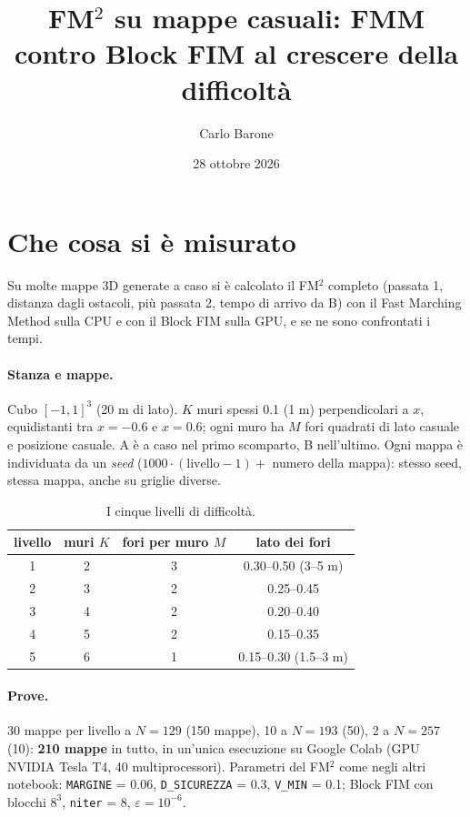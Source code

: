 \documentclass[11pt,a4paper]{article}
\title{FM$^2$ su mappe casuali: FMM contro Block FIM al crescere della difficoltà}
\author{Carlo Barone}
\date{28 ottobre 2026}
\begin{document}
\maketitle

\section{Che cosa si è misurato}
Su molte mappe 3D generate a caso si è calcolato il FM$^2$ completo (passata 1, distanza dagli ostacoli, più passata 2, tempo di arrivo da B) con il Fast Marching Method sulla CPU e con il Block FIM sulla GPU, e se ne sono confrontati i tempi.

\paragraph{Stanza e mappe.} Cubo $[-1,1]^3$ (20 m di lato). $K$ muri spessi 0.1 (1 m) perpendicolari a $x$, equidistanti tra $x=-0.6$ e $x=0.6$; ogni muro ha $M$ fori quadrati di lato casuale e posizione casuale. A è a caso nel primo scomparto, B nell'ultimo. Ogni mappa è individuata da un \emph{seed} ($1000\cdot(\text{livello}-1)+$ numero della mappa): stesso seed, stessa mappa, anche su griglie diverse.

\begin{table}[H]
\centering
\begin{tabular}{cccc}
\toprule
livello & muri $K$ & fori per muro $M$ & lato dei fori \\
\midrule
1 & 2 & 3 & 0.30--0.50 (3--5 m) \\
2 & 3 & 2 & 0.25--0.45 \\
3 & 4 & 2 & 0.20--0.40 \\
4 & 5 & 2 & 0.15--0.35 \\
5 & 6 & 1 & 0.15--0.30 (1.5--3 m) \\
\bottomrule
\end{tabular}
\caption{I cinque livelli di difficoltà.}
\end{table}

\paragraph{Prove.} 30 mappe per livello a $N=129$ (150 mappe), 10 a $N=193$ (50), 2 a $N=257$ (10): \textbf{210 mappe} in tutto, in un'unica esecuzione su Google Colab (GPU NVIDIA Tesla T4, 40 multiprocessori). Parametri del FM$^2$ come negli altri notebook: \texttt{MARGINE} = 0.06, \texttt{D\_SICUREZZA} = 0.3, \texttt{V\_MIN} = 0.1; Block FIM con blocchi $8^3$, \texttt{niter} = 8, $\varepsilon = 10^{-6}$.
\end{document}
